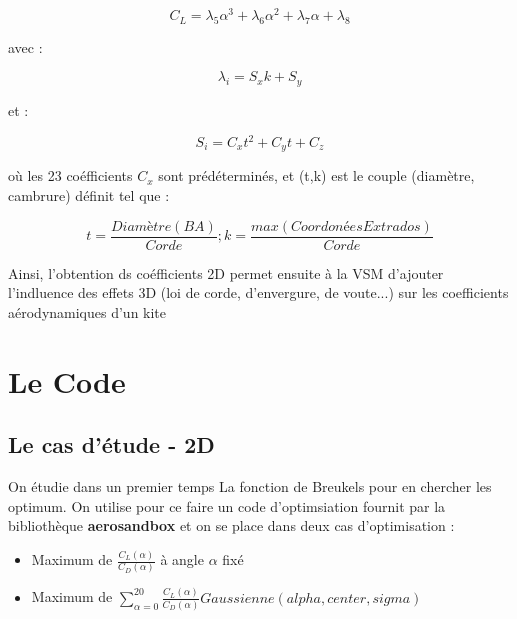 \documentclass[conference]{IEEEtran}
\begin{document}
\begin{center}
    \begin{equation}
        C_L = \lambda_5  \alpha^3 +\lambda_6  \alpha^2 + \lambda_7  \alpha + \lambda_8
        \label{eq:Cl_breukels}
    \end{equation}
\end{center}
avec :
\begin{center}
    \begin{equation}
        \lambda_i = S_x  k + S_y
        \label{eq:lamba_breukels}
    \end{equation}
\end{center}
et :
\begin{center}
    \begin{equation}
        S_i = C_x  t^2 + C_y  t + C_z
        \label{eq:S_breukels}
    \end{equation}
\end{center}
où les 23 coéfficients $C_x$ sont prédéterminés, et (t,k) est le couple (diamètre, cambrure) définit tel que :
\begin{center}
    \begin{equation}
        t = \frac{Diamètre(BA)}{Corde} ; k = \frac{max(CoordonéesExtrados)}{Corde}
        \label{eq:tk_breukels}
    \end{equation}
\end{center}

Ainsi, l'obtention ds coéfficients 2D permet ensuite à la VSM d'ajouter l'indluence des effets 3D (loi de corde, d'envergure, de voute...) sur les coefficients aérodynamiques d'un kite

\IEEEpeerreviewmaketitle
\section{Le Code }

\subsection{Le cas d'étude - 2D} 

On étudie dans un premier temps La fonction de Breukels pour en chercher les optimum. On utilise pour ce faire un code d'optimsiation fournit par la bibliothèque \textbf{aerosandbox} et on se place dans deux cas d'optimisation : 
\begin{itemize}
    \item Maximum de $\frac{C_L(\alpha)}{C_D(\alpha)}$ à angle $\alpha$ fixé 
    \item Maximum de $\sum_{\alpha = 0}^{20}\frac{C_L(\alpha)}{C_D(\alpha)} Gaussienne(alpha, center, sigma) $
\end{itemize}
\end{document}
